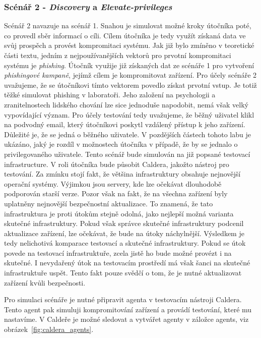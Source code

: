 \subsubsection{Scénář 2 - \textit{Discovery} a \textit{Elevate-privileges}}%
Scénář 2 navazuje na scénář 1.
Snahou je simulovat možné kroky útočníka poté, co provedl sběr informací o cíli.
Cílem útočníka je tedy využít získaná data ve svůj prospěch a provést kompromitaci systému.
Jak již bylo zmíněno v teoretické části textu, jedním z nejpoužívanějších vektorů pro prvotní kompromitaci systému je \textit{phishing}.
Útočník využije již získaných dat ze scénáře 1 pro vytvoření \textit{phishingové kampaně}, jejímž cílem je kompromitovat zařízení.
Pro účely scénáře 2 uvažujeme, že se útočníkovi tímto vektorem povedlo získat prvotní vstup.
Je totiž těžké simulovat phishing v laboratoři.
Jeho založení na psychologii a zranitelnostech lidského chování lze sice jednoduše napodobit, nemá však velký vypovídající význam.
Pro účely testování tedy uvažujeme, že běžný uživatel klikl na podvodný email, který útočníkovi poskytl vzdálený přístup k jeho zařízení.
Důležité je, že se jedná o běžného uživatele.
V pozdějších částech tohoto labu je ukázáno, jaký je rozdíl v možnostech útočníka v případě, že by se jednalo o privilegovaného uživatele.
Tento scénář bude simulován na již popsané testovací infrastructure.
V roli útočníka bude působit Caldera, jakožto nástroj pro testování.
Za zmínku stojí fakt, že většina infrastruktury obsahuje nejnovější operační systémy.
Výjimkou jsou servery, kde lze očekávat dlouhodobě podporován starší verze.
Pozor však na fakt, že na všechna zařízení byly uplatněny nejnovější bezpečnostní aktualizace.
To znamená, že tato infrastruktura je proti útokům stejně odolná, jako nejlepší možná varianta skutečné infrastruktury.
Pokud však správce skutečné infrastruktury podcenil aktualizace zařízení, lze očekávat, že bude na útoky náchylnější.
Výsledkem je tedy nelichotivá komparace testovací a skutečné infrastruktury.
Pokud se útok povede na testovací infrastruktuře, zcela jistě ho bude možné provézt i na skutečné.
I nevydařený útok na testovacím prostředí má však šanci na skutečné infrastruktuře uspět.
Tento fakt pouze svědčí o tom, že je nutné aktualizovat zařízení kvůli bezpečnosti.


Pro simulaci scénáře je nutné připravit agenta v testovacím nástroji Caldera.
Tento agent pak simuluji kompromitování zařízení a provádí testování, které mu nastavíme.
V Caldeře je možné sledovat a vytvářet agenty v záložce agents, viz obrázek~\ref{fig:caldera_agents}.

